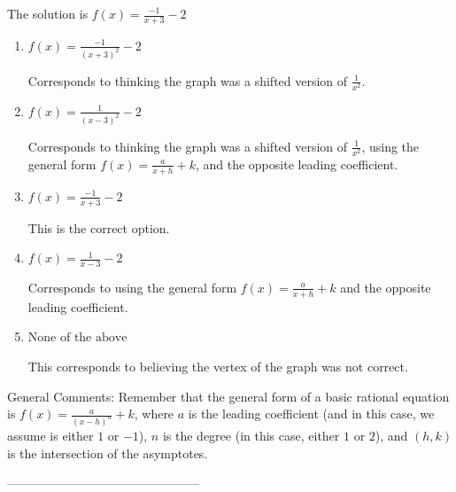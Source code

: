 \documentclass{extbook}[14pt]
\begin{document}
The solution is $ f(x) = \frac{-1}{x + 3} - 2 $ 

\begin{enumerate}[label=\Alph*.] 
\item $ f(x) = \frac{-1}{(x + 3)^2} - 2 $ 

 Corresponds to thinking the graph was a shifted version of $\frac{1}{x^2}$. 
\item $ f(x) = \frac{1}{(x - 3)^2} - 2 $ 

 Corresponds to thinking the graph was a shifted version of $\frac{1}{x^2}$, using the general form $f(x) = \frac{a}{x+h}+k$, and the opposite leading coefficient. 
\item $ f(x) = \frac{-1}{x + 3} - 2 $ 

 This is the correct option. 
\item $ f(x) = \frac{1}{x - 3} - 2 $ 

 Corresponds to using the general form $f(x) = \frac{a}{x+h}+k$ and the opposite leading coefficient. 
\item $ \text{None of the above} $ 

 This corresponds to believing the vertex of the graph was not correct. 
\end{enumerate} 
 
General Comments: Remember that the general form of a basic rational equation is $ f(x) = \frac{a}{(x-h)^n} + k$, where $a$ is the leading coefficient (and in this case, we assume is either $1$ or $-1$), $n$ is the degree (in this case, either $1$ or $2$), and $(h, k)$ is the intersection of the asymptotes.

-----------------------------------------------
\end{document}
